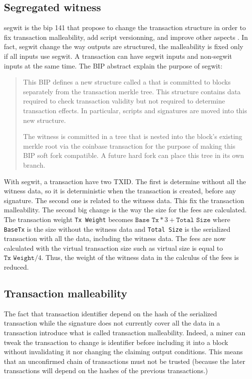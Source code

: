 \subsection{Segregated witness}

\gls{segwit} is the \gls{bip} 141 that propose to change the transaction structure
in order to fix transaction malleability, add script versionning, and improve other
aspects \cite{SegWit, SegWitBIP}. In fact, \gls{segwit} change the way outputs are
structured, the malleability is fixed only if all inputs use \gls{segwit}. A
transaction can have \gls{segwit} inputs and non-\gls{segwit} inputs at the same
time. The BIP abstract explain the purpose of \gls{segwit}:

\begin{quote}
  This BIP defines a new structure called a  that is committed to
  blocks separately from the transaction merkle tree. This structure contains
  data required to check transaction validity but not required to determine
  transaction effects. In particular, scripts and signatures are moved into this
  new structure.

  The witness is committed in a tree that is nested into the block's existing
  merkle root via the coinbase transaction for the purpose of making this BIP
  soft fork compatible. A future hard fork can place this tree in its own branch.
\end{quote}

With \gls{segwit}, a transaction have two TXID. The first is determine without
all the witness data, so it is deterministic when the transaction is created,
before any signature. The second one is related to the witness data. This fix
the transaction malleability. The second big change is the way the size for the
fees are calculated. The transaction weight \texttt{Tx Weight} becomes
$\texttt{Base Tx} * 3 + \texttt{Total Size}$ where \texttt{BaseTx} is the size
without the witness data and \texttt{Total Size} is the serialized transaction
with all the data, including the witness data.
The fees are now calculated with the virtual transaction size such as virtual
size is equal to $\texttt{Tx Weight} / 4$. Thus, the weight of the witness data
in the calculus of the fees is reduced.

\subsection{Transaction malleability}

The fact that transaction identifier depend on the hash of the serialized transaction
while the signature does not currently cover all the data in a transaction introduce
what is called transaction malleability. Indeed, a miner can tweak the transaction to
change is identifier before including it into a block without invalidating it nor
changing the claiming output conditions. This means that an unconfirmed chain of
transactions must not be trusted (because the later transactions will depend on
the hashes of the previous transactions.)

